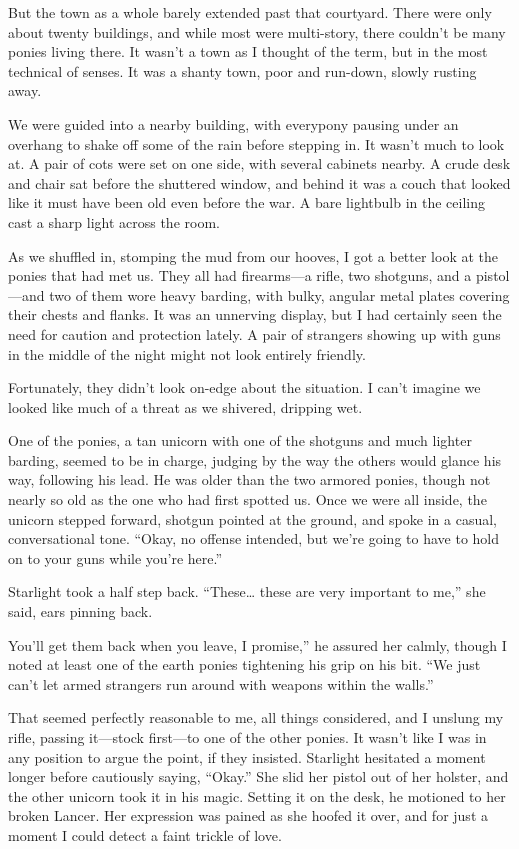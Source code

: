 But the town as a whole barely extended past that courtyard. There were only about twenty buildings, and while most were multi-story, there couldn’t be many ponies living there. It wasn’t a town as I thought of the term, but in the most technical of senses. It was a shanty town, poor and run-down, slowly rusting away.

We were guided into a nearby building, with everypony pausing under an overhang to shake off some of the rain before stepping in. It wasn’t much to look at. A pair of cots were set on one side, with several cabinets nearby. A crude desk and chair sat before the shuttered window, and behind it was a couch that looked like it must have been old even before the war. A bare lightbulb in the ceiling cast a sharp light across the room.

As we shuffled in, stomping the mud from our hooves, I got a better look at the ponies that had met us. They all had firearms—a rifle, two shotguns, and a pistol—and two of them wore heavy barding, with bulky, angular metal plates covering their chests and flanks. It was an unnerving display, but I had certainly seen the need for caution and protection lately. A pair of strangers showing up with guns in the middle of the night might not look entirely friendly.

Fortunately, they didn’t look on-edge about the situation. I can’t imagine we looked like much of a threat as we shivered, dripping wet.

One of the ponies, a tan unicorn with one of the shotguns and much lighter barding, seemed to be in charge, judging by the way the others would glance his way, following his lead. He was older than the two armored ponies, though not nearly so old as the one who had first spotted us. Once we were all inside, the unicorn stepped forward, shotgun pointed at the ground, and spoke in a casual, conversational tone. “Okay, no offense intended, but we’re going to have to hold on to your guns while you’re here.”

Starlight took a half step back. “These… these are very important to me,” she said, ears pinning back.

\leavevmode{}You’ll get them back when you leave, I promise,” he assured her calmly, though I noted at least one of the earth ponies tightening his grip on his bit. “We just can’t let armed strangers run around with weapons within the walls.”

That seemed perfectly reasonable to me, all things considered, and I unslung my rifle, passing it—stock first—to one of the other ponies. It wasn’t like I was in any position to argue the point, if they insisted. Starlight hesitated a moment longer before cautiously saying, “Okay.” She slid her pistol out of her holster, and the other unicorn took it in his magic. Setting it on the desk, he motioned to her broken Lancer. Her expression was pained as she hoofed it over, and for just a moment I could detect a faint trickle of love.

